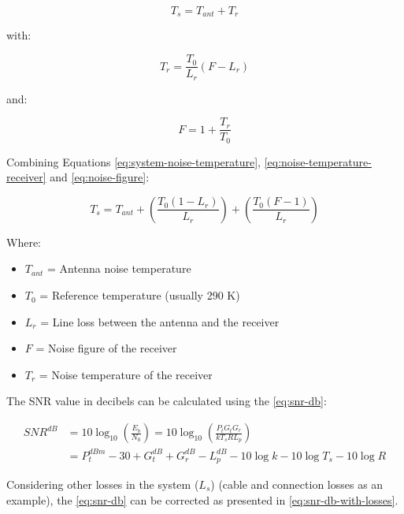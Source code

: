 \begin{equation} \label{eq:system-noise-temperature}
    T_{s} = T_{ant} + T_{r}
\end{equation}

with:

\begin{equation} \label{eq:noise-temperature-receiver}
    T_{r} = \frac{T_{0}}{L_{r}} (F - L_{r})
\end{equation}

and:

\begin{equation} \label{eq:noise-figure}
    F = 1 + \frac{T_{r}}{T_{0}}
\end{equation}

Combining Equations \ref{eq:system-noise-temperature}, \ref{eq:noise-temperature-receiver} and \ref{eq:noise-figure}:

\begin{equation} \label{eq:system-noise-temp-expanded}
    T_{s} = T_{ant} + \left( \frac{T_{0}(1 - L_{r})}{L_{r}} \right) + \left( \frac{T_{0} (F - 1)}{L_{r}} \right)
\end{equation}

Where:

\begin{itemize}
    \item $T_{ant}$ = Antenna noise temperature
    \item $T_{0}$ = Reference temperature (usually 290 K)
    \item $L_{r}$ = Line loss between the antenna and the receiver
    \item $F$ = Noise figure of the receiver
    \item $T_{r}$ = Noise temperature of the receiver
\end{itemize}

The SNR value in decibels can be calculated using the \autoref{eq:snr-db}:

\begin{equation} \label{eq:snr-db}
    \begin{split}
        SNR^{dB} & = 10\log_{10}\left( \frac{E_{b}}{N_{0}} \right) = 10\log_{10} \left( \frac{P_{t}G_{t}G_{r}}{kT_{s}RL_{p}} \right) \\
                 & = P_{t}^{dBm} - 30 + G_{t}^{dB} + G_{r}^{dB} - L_{p}^{dB} - 10\log k - 10\log T_{s} - 10\log R
    \end{split}
\end{equation}

Considering other losses in the system ($L_{s}$) (cable and connection losses as an example), the \autoref{eq:snr-db} can be corrected as presented in \autoref{eq:snr-db-with-losses}.


